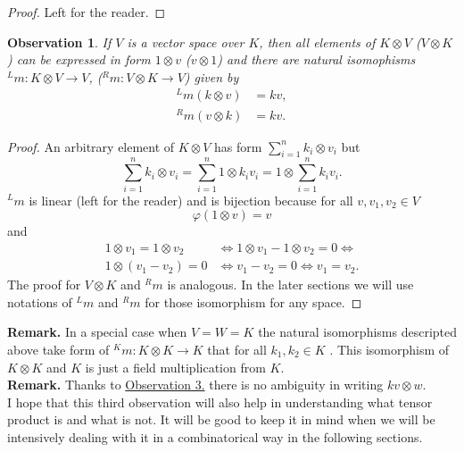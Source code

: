 \documentclass[a4paper]{article}
\newtheorem{observation}{Observation}
\begin{document}
\begin{proof}
Left for the reader.
\end{proof}
\begin{observation}\label{observation:5}
If $V$ is a vector space over $K$, then all elements of $K \otimes V$ ($V \otimes K$) can be expressed in form 
$1 \otimes v$ ($v \otimes 1$) and there are natural isomophisms ${^Lm} : K \otimes V \to V$, 
(${^Rm} : V \otimes K \to V$) given by
\begin{align*}
{^Lm}(k \otimes v) &= kv, \\
{^Rm}(v \otimes k) &= kv.
\end{align*}
\end{observation}
\begin{proof}
An arbitrary element of $K \otimes V$ has form $\displaystyle\sum^n_{i=1}k_i \otimes v_i$ but
\begin{equation*}
\sum^n_{i=1}k_i \otimes v_i = \sum^n_{i=1} 1 \otimes k_iv_i = 1 \otimes \sum^n_{i=1}k_iv_i.
\end{equation*}
${^Lm}$ is linear (left for the reader) and is bijection because for all $v, v_1, v_2 \in V$
\begin{equation*}
\varphi(1 \otimes v) = v
\end{equation*}
and 
\begin{align*}
1 \otimes v_1 = 1 \otimes v_2 &\iff 1 \otimes v_1 - 1 \otimes v_2 = 0 \iff \\ 
1 \otimes (v_1 - v_2) = 0 &\iff v_1 -v_2 = 0 \iff v_1 = v_2.
\end{align*}
The proof for $V \otimes K$ and ${^Rm}$ is analogous. In the later sections we will use notations of
${^Lm}$ and ${^Rm}$ for those isomorphism for any space.
\end{proof}
\textbf{Remark. } In a special case when $V = W = K$ the natural isomorphisms descripted above 
take form of ${^Km} : K \otimes K \to K$ that for all $k_1, k_2\in K$
. This isomorphism of $K \otimes K$ and $K$ is just a field 
multiplication from $K$. \\[8pt]
\noindent \textbf{Remark. } Thanks to \hyperref[observation:3]{Observation 3.} there is no ambiguity in writing
$kv \otimes w$. \\
I hope that this third observation will also help in understanding what tensor product is and what is not.
It will be good to keep it in mind when we will be intensively dealing with it in a combinatorical way in the
following sections.
\end{document}
